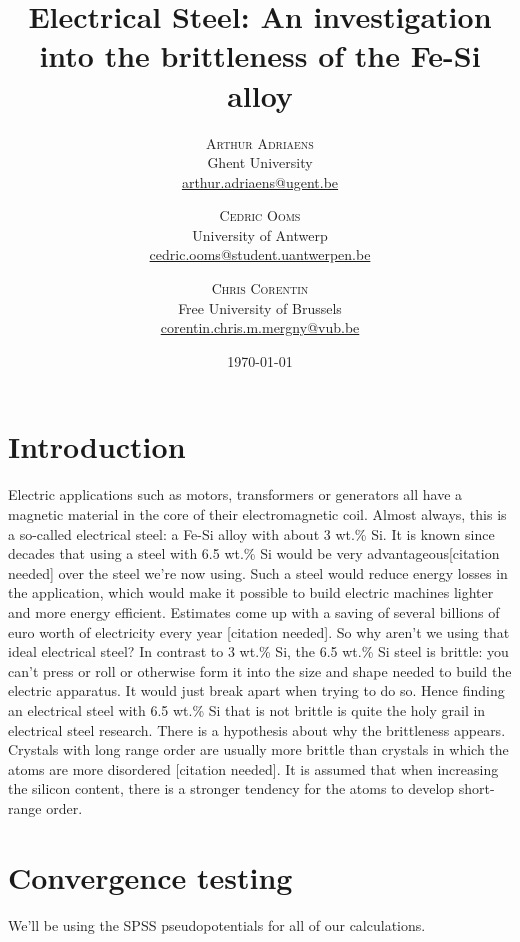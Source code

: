 \documentclass[twoside,twocolumn,11pt]{article} %
\title{Electrical Steel: An investigation into the
brittleness of the Fe-Si alloy} %
\author{%
\textsc{Arthur Adriaens} \\[1ex] %
\normalsize Ghent University \\ %
\normalsize \href{mailto:arthur.adriaens@ugent.be}{arthur.adriaens@ugent.be} %
\and %
\textsc{Cedric Ooms} \\[1ex] %
\normalsize University of Antwerp \\ %
\normalsize \href{mailto:cedric.ooms@student.uantwerpen.be}{cedric.ooms@student.uantwerpen.be} %
\and %
\textsc{Chris Corentin} \\[1ex] %
\normalsize Free University of Brussels \\ %
\normalsize \href{mailto:corentin.chris.m.mergny@vub.be}{corentin.chris.m.mergny@vub.be} %
}
\date{\today} %
\begin{document}
\maketitle


\section{Introduction}
Electric applications such as motors, transformers or generators all have a magnetic material in the core of their electromagnetic coil. Almost always, this is a so-called electrical steel: a Fe-Si alloy with about 3 wt.\% Si.
It is known since
decades that using a steel with 6.5 wt.\% Si would be very advantageous[citation needed] over the steel we're now using. Such a steel would
reduce energy losses in the application, which would make it possible to build electric machines lighter and more
energy efficient. Estimates come up with a saving of several billions of euro worth of electricity every
year [citation needed].
So why aren't we using that ideal electrical steel? In contrast to 3 wt.\% Si, the 6.5 wt.\% Si steel is
brittle: you can’t press or roll or otherwise form it into the size and shape needed to build the electric
apparatus. It would just break apart when trying to do so. Hence finding an electrical steel with 6.5 wt.\% Si
that is not brittle is quite the holy grail in electrical steel research.
There is a hypothesis about why the brittleness appears. Crystals with long range order are usually
more brittle than crystals in which the atoms are more disordered [citation needed]. It is assumed that when
increasing the silicon content, there is a stronger tendency for the atoms to develop short-range
order.


\section{Convergence testing}
We'll be using the SPSS pseudopotentials\cite{doi:11.1126/science.aad3000} \cite{Prandini2018} for all of our calculations.
\end{document}
